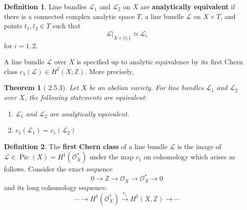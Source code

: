 \documentclass[12pt,reqno]{amsart}
\DeclareMathOperator{\Pic}{Pic}
\newcommand{\Z}{\mathbb{Z}}
\newcommand{\mc}{\mathcal}
\newtheorem*{thm*}{Theorem}
\theoremstyle{definition}
\newtheorem{defn}{Definition}
\theoremstyle{remark}
\newcommand{\ti}{\todo[inline]}
\begin{document}
\begin{defn} Line bundles $\mc{L}_1$ and $\mc{L}_2$  on $X$ are \textbf{analytically equivalent} if there is a connected complex analytic space $T$, a line bundle $\mc{L}$ on $X \times T$, and points $t_1, t_2 \in T$ such that $$\mc{L} |_{X\times \{t_i\}} \simeq \mc{L}_i$$ for $i = 1, 2$. \end{defn}

A line bundle $\mc{L}$ over $X$ is specified up to analytic equivalence by its first Chern class $c_1(\mc{L}) \in H^2(X; \Z)$. More precisely,

\begin{thm*} 
[\cite{bl} 2.5.3] Let $X$ be an abelian variety. For line bundles $\mc{L}_1$ and $\mc{L}_2$ over $X$, the following statements are equivalent: 
\begin{enumerate} 
\item $\mc{L}_1$ and $\mc{L}_2$ are analytically equivalent.
\item $c_1(\mc{L}_1) = c_1(\mc{L}_2)$
\end{enumerate}
\end{thm*}






\begin{defn} The \textbf{first Chern class} of a line bundle $\mc{L}$ is the image of $\mc{L} \in \Pic(X) = H^1(\mc{O}_X^*)$ under the map $c_1$ on cohomology which arises as follows. Consider the exact sequence $$0 \to \Z \to \mc{O}_X \to \mc{O}_X^* \to 0$$ and its long cohomology sequence:
$$\cdots \to H^1(\mc{O}_X^*) \xrightarrow{c_1} H^2(X, \Z) \to \cdots$$ \end{defn} 




\end{document}
